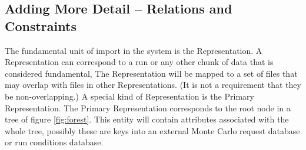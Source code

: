 \documentclass{cmspaper}
\begin{document}
\subsection{Adding More Detail -- Relations and Constraints}


The fundamental unit of import in the system is the Representation.  A Representation 
can correspond to a run or any other chunk of data that is considered fundamental,  
The Representation will be mapped to a set of files that may overlap with files in 
other Representations.  (It is not a requirement that they be non-overlapping.) A
special kind of Representation is the Primary Representation.  The Primary Representation
corresponds to the root node in a tree of figure \ref{fig:forest}.  This entity
will contain attributes associated with the whole tree, possibly these are keys into 
an external Monte Carlo request database or run conditions database.
\end{document}
